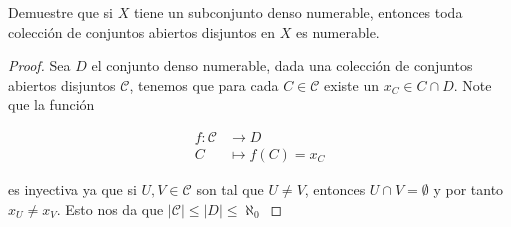 
  \item Demuestre que si $X$ tiene un subconjunto denso numerable, entonces toda colección de conjuntos abiertos disjuntos en $X$ es numerable.

  \begin{proof}
      Sea $D$ el conjunto denso numerable, dada una colección de conjuntos abiertos disjuntos $\mathcal{C}$, tenemos que para cada $C\in \mathcal{C}$ existe un $x_C\in C\cap D$. Note que la función

      \begin{align*}
        f : \mathcal{C} &\longrightarrow D \\
        C &\longmapsto f(C) = x_C
      \end{align*}
        
        es inyectiva ya que si $U,V\in \mathcal{C}$ son tal  que $U\neq V$, entonces $U\cap V=\emptyset$ y por tanto $x_U\neq x_V$. Esto nos da que $|\mathcal{C}|\leq |D|\leq \aleph_0$ 
  \end{proof}